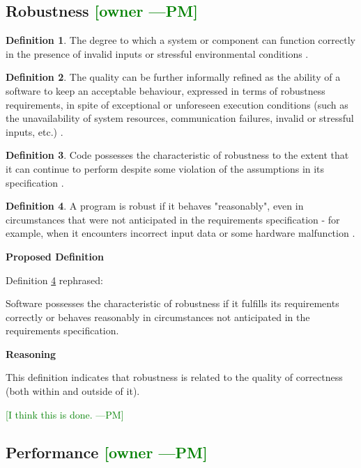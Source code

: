 \documentclass[letterpaper,cleveref]{lipics-v2019}
\newcommand{\authornote}[3]{\textcolor{#1}{[#3 ---#2]}}
\newcommand{\authornote}[3]{}
\newcommand{\pmi}[1]{\authornote{green}{PM}{#1}} %
\theoremstyle{definition}
\newtheorem{defn}{Definition}
\begin{document}
\subsection{Robustness \pmi{owner}}
\begin{defn}
  The degree to which a system or component can function correctly in the
  presence of invalid inputs or stressful environmental conditions
  \citep{IEEEStdGlossarySET1990}.
\end{defn}
\begin{defn}
  The quality can be further informally refined as the ability of a software to
  keep an acceptable behaviour, expressed in terms of robustness requirements, in
  spite of exceptional or unforeseen execution conditions (such as the
  unavailability of system resources, communication failures, invalid or
  stressful inputs, etc.) \citep{fernandez2005model}.
\end{defn}
\begin{defn}
  Code possesses the characteristic of robustness to the extent that it can
  continue to perform despite some violation of the assumptions in its
  specification \citep{boehm2007software}.
\end{defn}
\begin{defn} \label{RobustnessDefnSelected}
  A program is robust if it behaves "reasonably", even in circumstances that
  were not anticipated in the requirements specification - for example, when it
  encounters incorrect input data or some hardware malfunction
  \citep{ghezzi1991fundamentals}.
\end{defn}

\noindent \textbf{Proposed Definition}

Definition \ref{RobustnessDefnSelected} rephrased:

Software possesses the characteristic of robustness if it fulfills its
requirements correctly or behaves reasonably in circumstances not anticipated in
the requirements specification.

\noindent \textbf{Reasoning}

This definition indicates that robustness is related to the quality of
correctness (both within and outside of it). 

\pmi{I think this is done.}

\subsection{Performance \pmi{owner}}
\end{document}
